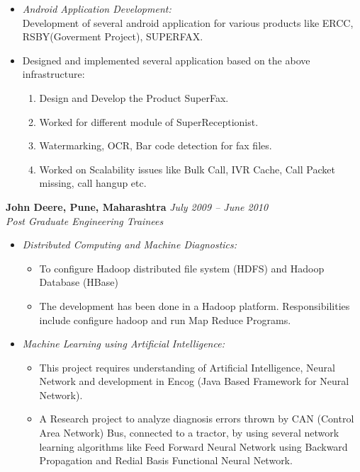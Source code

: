 \documentclass[margin,line]{resume}
\begin{document}
\begin{resume}
\begin{itemize}
     \item \textsl{Android Application Development:} \\
      Development of several android application for various products like ERCC, RSBY(Goverment Project), SUPERFAX.
     \item Designed and implemented several application based on the above infrastructure:
        \begin{enumerate}
         \item Design and Develop the Product SuperFax.
         \item Worked for different module of SuperReceptionist.
	     \item Watermarking, OCR, Bar code detection for fax files.
	     \item Worked on Scalability issues like Bulk Call, IVR Cache, Call Packet missing, call hangup etc.
        \end{enumerate}
    \end{itemize}

    \textbf{John Deere, Pune, Maharashtra }\hfill \textsl{July 2009 -- June 2010}\vspace{0mm}\\\vspace{0mm}%
    \textsl{Post Graduate Engineering Trainees} 
     \begin{itemize}
     \item \textsl{Distributed Computing and Machine Diagnostics:} 
            \begin{itemize}
             \item To configure Hadoop distributed file system (HDFS) and Hadoop Database (HBase)
             \item The development has been done in a Hadoop platform. Responsibilities include configure hadoop and run Map Reduce Programs.
             \end{itemize}
     \item \textsl{Machine Learning using Artificial Intelligence:}
             \begin{itemize}
              \item This project requires understanding of Artificial Intelligence, Neural Network and development in Encog (Java Based Framework for Neural Network).
	       \item A Research project to analyze diagnosis errors thrown by CAN (Control Area  Network) Bus,
   connected to a tractor, by using several network learning algorithms like Feed Forward Neural Network using Backward Propagation and Redial Basis Functional Neural Network.
               \end{itemize}
      \end{itemize}

\end{resume}
\end{document}
